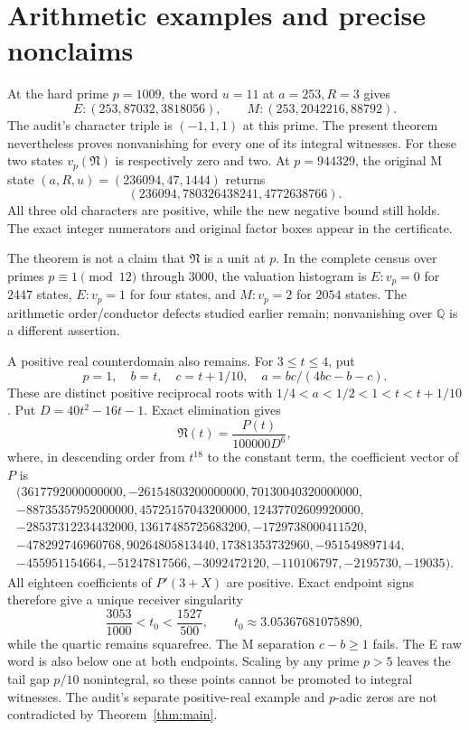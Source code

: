 \section{Arithmetic examples and precise nonclaims}
At the hard prime $p=1009$, the word $u=11$ at $a=253,R=3$ gives
\[
 E:(253,87032,3818056),\qquad
 M:(253,2042216,88792).
\]
The audit's character triple is $(-1,1,1)$ at this prime. The present theorem
nevertheless proves nonvanishing for every one of its integral witnesses.
For these two states $v_p(\mathfrak N)$ is respectively zero and two. At
$p=944329$, the original M state $(a,R,u)=(236094,47,1444)$ returns
\[
 (236094,780326438241,4772638766).
\]
All three old characters are positive, while the new negative bound still holds.
The exact integer numerators and original factor boxes appear in the certificate.

The theorem is not a claim that $\mathfrak N$ is a unit at $p$. In the complete
census over primes $p\equiv1\pmod{12}$ through $3000$, the valuation histogram
is $E:v_p=0$ for $2447$ states, $E:v_p=1$ for four states, and $M:v_p=2$ for
$2054$ states. The arithmetic order/conductor defects studied earlier remain;
nonvanishing over $\mathbb Q$ is a different assertion.

A positive real counterdomain also remains. For $3\le t\le4$, put
\[
 p=1,\quad b=t,\quad c=t+1/10,\quad a=bc/(4bc-b-c).
\]
These are distinct positive reciprocal roots with $1/4<a<1/2<1<t<t+1/10$.
Put $D=40t^2-16t-1$. Exact elimination gives
\[
 \mathfrak N(t)=\frac{P(t)}{100000D^6},
\]
where, in descending order from $t^{18}$ to the constant term, the coefficient
vector of $P$ is
\[
\begin{gathered}
(3617792000000000,-26154803200000000,70130040320000000,\\
-88735357952000000,45725157043200000,12437702609920000,\\
-28537312234432000,13617485725683200,-1729738000411520,\\
-478292746960768,90264805813440,17381353732960,-951549897144,\\
-455951154664,-51247817566,-3092472120,-110106797,-2195730,-19035).
\end{gathered}
\]
All eighteen coefficients of $P'(3+X)$ are positive. Exact endpoint signs
therefore give a unique receiver singularity
\[
 \frac{3053}{1000}<t_0<\frac{1527}{500},
 \qquad t_0\approx3.05367681075890,
\]
while the quartic remains squarefree. The M separation
$c-b\ge1$ fails. The E raw word is also below one at both endpoints. Scaling
by any prime $p>5$ leaves the tail gap $p/10$ nonintegral, so these points cannot
be promoted to integral witnesses. The audit's separate positive-real example
and $p$-adic zeros are not contradicted by Theorem~\ref{thm:main}.


